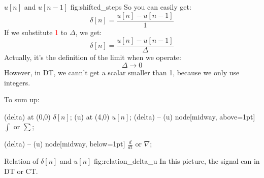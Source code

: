                {$u[n]$ and $u[n-1]$}
                {fig:shifted_steps}
        So you can easily get:
            \begin{equation}
                \delta[n] = \frac{u[n] - u[n-1]}{1}
            \end{equation}
        If we substitute \textcolor{red}{1} to $\Delta$, we get:
            \begin{equation}
                \delta[n] = \frac{u[n] - u[n-1]}{\Delta}
            \end{equation}
        Actually, it's the definition of the limit when we operate:
            \begin{equation}
                \Delta \rightarrow 0
            \end{equation}
        However, in DT, we cann't get a scalar smaller than 1, because we only use integers.

        To sum up:
            \inserttikzpicture
                {
            
                 (delta) at (0,0) {$\delta[n]$};
                 (u) at (4,0) {$u[n]$}; 
                \draw[
                    ->,               %
                    thick,            %
                    shorten <=2pt,    
                    shorten >=2pt,
                    transform canvas={yshift=2.5pt}     
                ] 
                    (delta) -- (u) %
                    node[midway, above=1pt] {$\int$ or $\sum$};
                
                \draw[
                    <-,               %
                    thick,            %
                    shorten <=2pt,    
                    shorten >=2pt,
                    transform canvas={yshift=-2.5pt}     
                ] 
                (delta) -- (u) %
                node[midway, below=1pt] {$\frac{d}{dt}$ or $\nabla$};
                }
                {Relation of $\delta[n]$ and $u[n]$}
                {fig:relation_delta_u}
        \noindent In this picture, the signal can in DT or CT.

